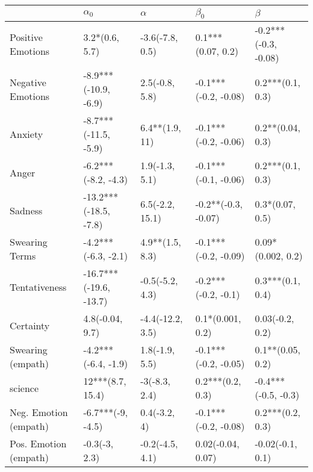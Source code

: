 \begin{tabular}{lllll}
\toprule
{} &              $\alpha_0$ &          $\alpha$ &             $\beta_0$ &               $\beta$ \\
\midrule
Positive Emotions     &          3.2*(0.6, 5.7) &   -3.6(-7.8, 0.5) &     0.1***(0.07, 0.2) &  -0.2***(-0.3, -0.08) \\
Negative Emotions     &    -8.9***(-10.9, -6.9) &    2.5(-0.8, 5.8) &  -0.1***(-0.2, -0.08) &      0.2***(0.1, 0.3) \\
Anxiety               &    -8.7***(-11.5, -5.9) &    6.4**(1.9, 11) &  -0.1***(-0.2, -0.06) &      0.2**(0.04, 0.3) \\
Anger                 &     -6.2***(-8.2, -4.3) &    1.9(-1.3, 5.1) &  -0.1***(-0.1, -0.06) &      0.2***(0.1, 0.3) \\
Sadness               &   -13.2***(-18.5, -7.8) &   6.5(-2.2, 15.1) &   -0.2**(-0.3, -0.07) &       0.3*(0.07, 0.5) \\
Swearing Terms        &     -4.2***(-6.3, -2.1) &   4.9**(1.5, 8.3) &  -0.1***(-0.2, -0.09) &     0.09*(0.002, 0.2) \\
Tentativeness         &  -16.7***(-19.6, -13.7) &   -0.5(-5.2, 4.3) &   -0.2***(-0.2, -0.1) &      0.3***(0.1, 0.4) \\
Certainty             &         4.8(-0.04, 9.7) &  -4.4(-12.2, 3.5) &      0.1*(0.001, 0.2) &       0.03(-0.2, 0.2) \\
Swearing (empath)     &     -4.2***(-6.4, -1.9) &    1.8(-1.9, 5.5) &  -0.1***(-0.2, -0.05) &      0.1**(0.05, 0.2) \\
science               &        12***(8.7, 15.4) &     -3(-8.3, 2.4) &      0.2***(0.2, 0.3) &   -0.4***(-0.5, -0.3) \\
Neg. Emotion (empath) &       -6.7***(-9, -4.5) &      0.4(-3.2, 4) &  -0.1***(-0.2, -0.08) &      0.2***(0.2, 0.3) \\
Pos. Emotion (empath) &           -0.3(-3, 2.3) &   -0.2(-4.5, 4.1) &     0.02(-0.04, 0.07) &      -0.02(-0.1, 0.1) \\
\bottomrule
\end{tabular}
